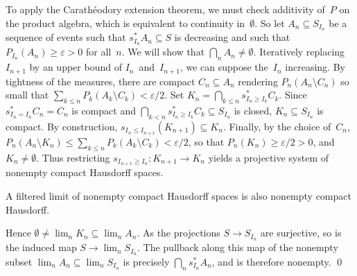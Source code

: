 To apply the Carathéodory extension theorem,
we must check \sig additivity of~$P$ on the product algebra,
which is equivalent to continuity in~$\emptyset$.
So let \( A_n \subseteq S_{I_n} \) be a sequence of events
such that \( s_{I_n}^* A_n \subseteq S \) is decreasing
and such that \( P_{I_n}(A_n) \ge \varepsilon > 0 \) for all~$n$.
We will show that \( \bigcap_n A_n \ne \emptyset \).
Iteratively replacing~$I_{n+1}$ by an upper bound of $I_n$~and~$I_{n+1}$,
we can suppose the~$I_n$ increasing.
By tightness of the measures, there are compact \( C_n \subseteq A_n \)
rendering \( P_n(A_n \setminus C_n) \) so small that
\( \sum_{k \le n} P_k(A_k \setminus C_k) < \varepsilon/2 \).
Set \( K_n = \bigcap_{k \le n} s_{I_n \ge I_k}^* C_k \).
Since \( s_{I_n = I_n}^* C_n = C_n \) is compact
and \( \bigcap_{k < n} s_{I_n \ge I_k}^* C_k \subseteq S_{I_n} \) is closed,
\( K_n \subseteq S_{I_n} \) is compact.
By construction, \( s_{I_n \le I_{n+1}}(K_{n+1}) \subseteq K_n \).
Finally, by the choice of~$C_n$,
\(	P_n( A_n \setminus K_n )
\le	\sum_{k \le n} P_k( A_k \setminus C_k )
<	\varepsilon/2
\), so that \( P_n(K_n) \ge \varepsilon/2 > 0 \),
and \( K_n \ne \emptyset \).
Thus restricting \( s_{I_{n+1} \ge I_n} \colon K_{n+1} \to K_n \)
yields a projective system of nonempty compact Hausdorff spaces.

\begin	{lemma}
A filtered limit of nonempty compact Hausdorff spaces
is also nonempty compact Hausdorff.
\end	{lemma}

Hence \( \emptyset \ne \lim_n K_n \subseteq \lim_n A_n \).
As the projections \( S \to S_{I_n} \) are surjective,
so is the induced map \( S \to \lim_n S_{I_n} \).
The pullback along this map of the nonempty subset
\( \lim_n A_n \subseteq \lim_n S_{I_n} \)
is precisely \( \bigcap_n s_{I_n}^* A_n \),
and is therefore nonempty.
\qed
